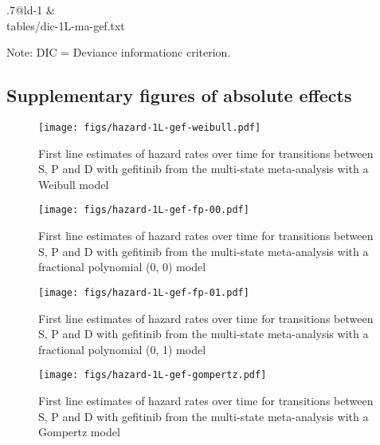 \documentclass[11pt,final,fleqn]{article}\usepackage[]{graphicx}\usepackage[]{color}
\makeatletter
\theoremstyle{plain}
\newcommand*\ExpandableInput[1]{\@@input#1 }
\makeatother
\begin{document}
\begin{appendices}
\begin{table}[!ht]
\begin{center}
\begin{threeparttable}
\caption{Deviance information criterion for first line fixed effects meta-analysis of gefitinib } \label{tbl:dic-ma-1L}
\begin{tabularx}{.7\textwidth}{@{\extracolsep{\fill}}ld{-1}}
\hline
{} &  \\
\hline
\ExpandableInput{tables/dic-1L-ma-gef.txt}
\hline
\end{tabularx}
\scriptsize
Note: DIC = Deviance informationc criterion.
\end{threeparttable}
\end{center}
\end{table}

\subsection{Supplementary figures of absolute effects}\label{app:1l-supp-figs}

\begin{figure}[h]
\centering
\texttt{[image: figs/hazard-1L-gef-weibull.pdf]} 
\caption{First line estimates of hazard rates over time for transitions between S, P and D with gefitinib from the multi-state meta-analysis with a Weibull model}\label{fig:hazard-1L-gef-weibull}
\end{figure}

\begin{figure}[h]
\centering
\texttt{[image: figs/hazard-1L-gef-fp-00.pdf]} 
\caption{First line estimates of hazard rates over time for transitions between S, P and D with gefitinib from the multi-state meta-analysis with a fractional polynomial (0, 0) model}\label{fig:hazard-1L-gef-fp-00}
\end{figure}

\begin{figure}[h]
\centering
\texttt{[image: figs/hazard-1L-gef-fp-01.pdf]} 
\caption{First line estimates of hazard rates over time for transitions between S, P and D with gefitinib from the multi-state meta-analysis with a fractional polynomial (0, 1) model}\label{fig:hazard-1L-gef-fp-01}
\end{figure}

\begin{figure}[h]
\centering
\texttt{[image: figs/hazard-1L-gef-gompertz.pdf]} 
\caption{First line estimates of hazard rates over time for transitions between S, P and D with gefitinib from the multi-state meta-analysis with a Gompertz model}\label{fig:hazard-1L-gef-gompertz}
\end{figure}


\end{appendices}
\end{document}

